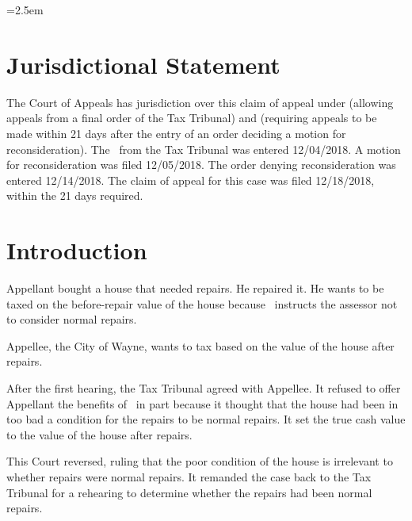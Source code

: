 \documentclass[12pt,\documentclassflag]{michiganCourtOfAppealsBrief}
\def\mathieuGast{\pincite[l]{MCL}{211.27(2)}}
\begin{document}
\newpage
\tableofauthorities

\pagestyle{plain}



\parindent=2.5em 
\doublespacing

\section{Jurisdictional Statement}

The Court of Appeals has jurisdiction over this claim of appeal under  (allowing appeals from a final order of the Tax Tribunal) and  (requiring appeals to be made within 21 days after the entry of an order deciding a motion for reconsideration). The \FOJ\ from the Tax Tribunal was entered 12/04/2018. A motion for reconsideration was filed 12/05/2018. The order denying reconsideration was entered 12/14/2018. The claim of appeal for this case was filed 12/18/2018, within the 21 days required.

\section{Introduction}

Appellant bought a house that needed repairs. He repaired it. He wants to be taxed on the before-repair value of the house because  \mathieuGast\ instructs the assessor not to consider normal repairs. 

Appellee, the City of Wayne, wants to tax based on the value of the house after repairs.

After the first hearing, the Tax Tribunal agreed with Appellee. It refused to offer Appellant the benefits of \mathieuGast\ in part because it thought that the house had been in too bad a condition for the repairs to be normal repairs. It set the true cash value to the value of the house after repairs.

This Court reversed, ruling that the poor condition of the house is irrelevant to whether repairs were normal repairs. It remanded the case back to the Tax Tribunal for a rehearing to determine whether the repairs had been normal repairs. 
\end{document}
